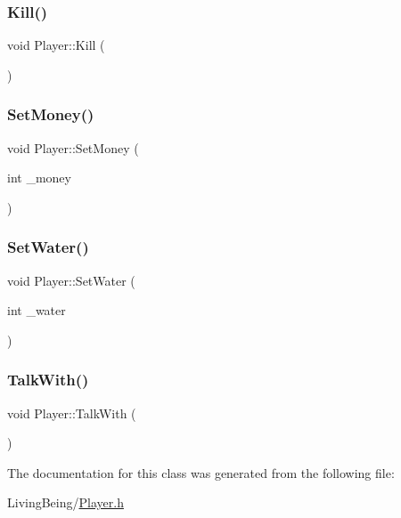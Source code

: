 \mbox{\label{classPlayer_a0c74d6bd430490417bb34e9abc233bb7}} 
\subsubsection{\texorpdfstring{Kill()}{Kill()}}
{\footnotesize\ttfamily void Player\+::\+Kill (\begin{DoxyParamCaption}{ }\end{DoxyParamCaption})}

\mbox{\label{classPlayer_ab94b37d55eb3f41717815c352d229069}} 
\subsubsection{\texorpdfstring{SetMoney()}{SetMoney()}}
{\footnotesize\ttfamily void Player\+::\+Set\+Money (\begin{DoxyParamCaption}\item[{int}]{\+\_\+money }\end{DoxyParamCaption})}

\mbox{\label{classPlayer_af63a1b8623e2dd0ddd420958a4896974}} 
\subsubsection{\texorpdfstring{SetWater()}{SetWater()}}
{\footnotesize\ttfamily void Player\+::\+Set\+Water (\begin{DoxyParamCaption}\item[{int}]{\+\_\+water }\end{DoxyParamCaption})}

\mbox{\label{classPlayer_ab9c49529f7a58aa62d8d78a5aa025b67}} 
\subsubsection{\texorpdfstring{TalkWith()}{TalkWith()}}
{\footnotesize\ttfamily void Player\+::\+Talk\+With (\begin{DoxyParamCaption}{ }\end{DoxyParamCaption})}



The documentation for this class was generated from the following file\+:\begin{DoxyCompactItemize}
\item 
Living\+Being/\mbox{\hyperlink{Player_8h}{Player.\+h}}\end{DoxyCompactItemize}
